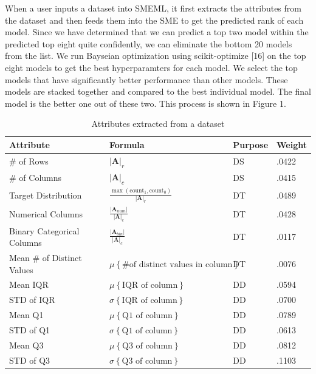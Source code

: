 \documentclass{article}
\begin{document}
When a user inputs a dataset into SMEML, it first extracts the attributes from the dataset and then feeds them into the SME to get the predicted rank of each model. Since we have determined that we can predict a top two model within the predicted top eight quite confidently, we can eliminate the bottom 20 models from the list. We run Bayseian optimization using scikit-optimize [16] on the top eight models to get the best hyperparamters for each model. We select the top models that have significantly better performance than other models. These models are stacked together and compared to the best individual model. The final model is the better one out of these two. This process is shown in Figure 1.
\begin{table}
  \caption{Attributes extracted from a dataset}
  \label{model-options-table}
  \centering
  \begin{tabular}{llll}
    \toprule
    Attribute & Formula & Purpose & Weight\\
    \midrule
    \# of Rows & $|\mathbf{A}|_r$ & DS & .0422 \\
    \hline
    \# of Columns & $|\mathbf{A}|_c$ & DS & .0415 \\
    \hline
    Target Distribution &
    $\frac{\max(\text{count}_1, \text{count}_0)}{|\mathbf{A}|_r}$
    & DT & .0489 \\
    \hline
    Numerical Columns &
    $\frac{|\mathbf{A}_{num}|}{|\mathbf{A}|_{c}}$
    & DT & .0428 \\
    \hline
    Binary Categorical Columns &
    $\frac{|\mathbf{A}_{bin}|}{|\mathbf{A}|_{c}}$
    & DT & .0117 \\
    \hline
    Mean \# of Distinct Values  & $\mu \left\{\text{\# of distinct values in column}\right\}$ & DT & .0076 \\ 
    \hline
    Mean IQR  & $\mu \left\{\text{IQR of column}\right\}$ & DD & .0594 \\ 
    \hline
    STD of IQR  & $\sigma \left\{\text{IQR of column}\right\}$ & DD & .0700 \\
    \hline
    Mean Q1 & $\mu \left\{\text{Q1 of column}\right\}$ & DD & .0789 \\
    \hline
    STD of Q1  & $\sigma \left\{\text{Q1 of column}\right\}$ & DD & .0613 \\
    \hline
    Mean Q3  & $\mu \left\{\text{Q3 of column}\right\}$ & DD & .0812 \\
    \hline
    STD of Q3  & $\sigma \left\{\text{Q3 of column}\right\}$ & DD & .1103 \\

\end{tabular}
\end{table}
\end{document}
